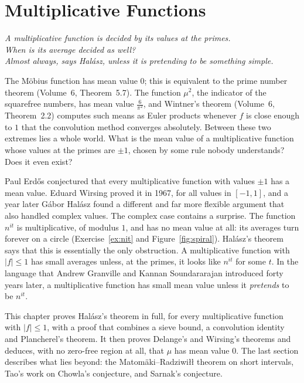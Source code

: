 \chapter{Multiplicative Functions}\label{ch:halasz}
\begin{center}\itshape
A multiplicative function is decided by its values at the primes.\\
When is its average decided as well?\\
Almost always, says Halász, unless it is pretending to be something simple.
\end{center}

The Möbius function has mean value $0$; this is equivalent to the prime number theorem (Volume~6, Theorem~5.7). The function $\mu^2$, the indicator of the squarefree numbers, has mean value $\frac6{\pi^2}$, and Wintner's theorem (Volume~6, Theorem~2.2) computes such means as Euler products whenever $f$ is close enough to $1$ that the convolution method converges absolutely. Between these two extremes lies a whole world. What is the mean value of a multiplicative function whose values at the primes are $\pm1$, chosen by some rule nobody understands? Does it even exist?

Paul Erdős conjectured that every multiplicative function with values $\pm1$ has a mean value. Eduard Wirsing proved it in 1967, for all values in $[-1,1]$, and a year later Gábor Halász found a different and far more flexible argument that also handled complex values. The complex case contains a surprise. The function $n^{it}$ is multiplicative, of modulus $1$, and has no mean value at all: its averages turn forever on a circle (Exercise~\ref{ex:nit} and Figure~\ref{fig:spiral}). Halász's theorem says that this is essentially the only obstruction. A multiplicative function with $|f|\le1$ has small averages unless, at the primes, it looks like $n^{it}$ for some $t$. In the language that Andrew Granville and Kannan Soundararajan introduced forty years later, a multiplicative function has small mean value unless it \emph{pretends} to be $n^{it}$.

This chapter proves Halász's theorem in full, for every multiplicative function with $|f|\le1$, with a proof that combines a sieve bound, a convolution identity and Plancherel's theorem. It then proves Delange's and Wirsing's theorems and deduces, with no zero-free region at all, that $\mu$ has mean value $0$. The last section describes what lies beyond: the Matomäki--Radziwiłł theorem on short intervals, Tao's work on Chowla's conjecture, and Sarnak's conjecture.

